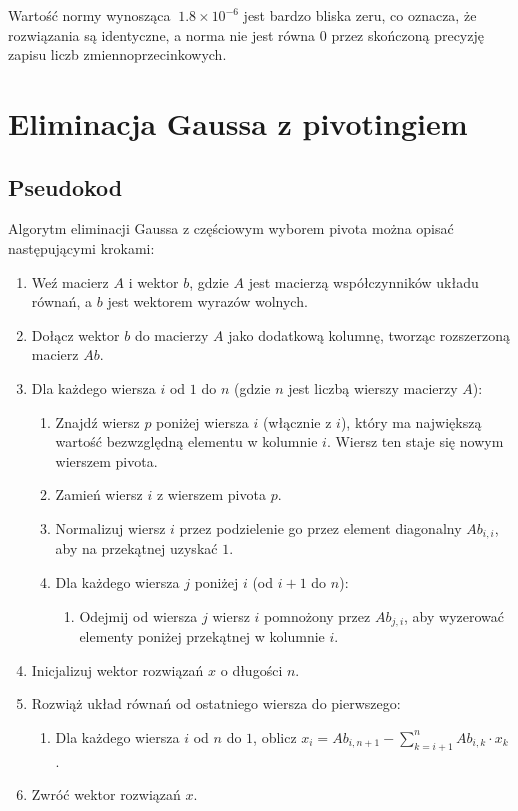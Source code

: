 \documentclass{article}
\begin{document}
Wartość normy wynosząca $~ 1.8 \times 10^{-6}$ jest bardzo bliska zeru, co oznacza, że rozwiązania są identyczne, a norma nie jest równa 0 przez skończoną precyzję zapisu liczb zmiennoprzecinkowych.

\section{Eliminacja Gaussa z pivotingiem}

\subsection{Pseudokod}

Algorytm eliminacji Gaussa z częściowym wyborem pivota można opisać następującymi krokami:

\begin{enumerate}
    \item Weź macierz $A$ i wektor $b$, gdzie $A$ jest macierzą współczynników układu równań, a $b$ jest wektorem wyrazów wolnych.
    \item Dołącz wektor $b$ do macierzy $A$ jako dodatkową kolumnę, tworząc rozszerzoną macierz $Ab$.
    \item Dla każdego wiersza $i$ od $1$ do $n$ (gdzie $n$ jest liczbą wierszy macierzy $A$):
    \begin{enumerate}
        \item Znajdź wiersz $p$ poniżej wiersza $i$ (włącznie z $i$), który ma największą wartość bezwzględną elementu w kolumnie $i$. Wiersz ten staje się nowym wierszem pivota.
        \item Zamień wiersz $i$ z wierszem pivota $p$.
        \item Normalizuj wiersz $i$ przez podzielenie go przez element diagonalny $Ab_{i,i}$, aby na przekątnej uzyskać $1$.
        \item Dla każdego wiersza $j$ poniżej $i$ (od $i+1$ do $n$):
        \begin{enumerate}
            \item Odejmij od wiersza $j$ wiersz $i$ pomnożony przez $Ab_{j,i}$, aby wyzerować elementy poniżej przekątnej w kolumnie $i$.
        \end{enumerate}
    \end{enumerate}
    \item Inicjalizuj wektor rozwiązań $x$ o długości $n$.
    \item Rozwiąż układ równań od ostatniego wiersza do pierwszego:
    \begin{enumerate}
        \item Dla każdego wiersza $i$ od $n$ do $1$, oblicz $x_i = Ab_{i,n+1} - \sum_{k=i+1}^{n} Ab_{i,k} \cdot x_k$.
    \end{enumerate}
    \item Zwróć wektor rozwiązań $x$.
\end{enumerate}
\end{document}
